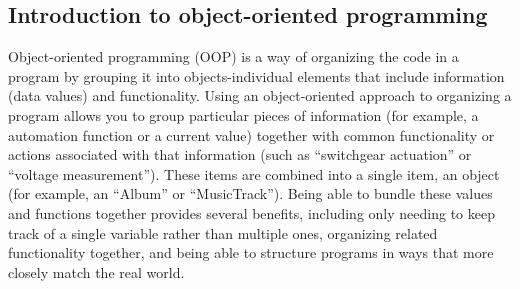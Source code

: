 \subsection{Introduction to object-oriented programming}

Object-oriented programming (OOP) is a way of organizing the code 
in a program by grouping it into objects-individual elements that include 
information (data values) and functionality. Using an 
object-oriented approach to organizing a program allows 
you to group particular pieces of information (for 
example, a automation function or a current value) together with 
common functionality or actions associated with that 
information (such as ``switchgear actuation'' or 
``voltage measurement''). These items are combined into a single 
item, an object (for example, an 
``Album'' or ``MusicTrack''). Being 
able to bundle these values and functions together provides several 
benefits, including only needing to keep track of a single 
variable rather than multiple ones, organizing related 
functionality together, and being able to structure 
programs in ways that more closely match the real world.  

